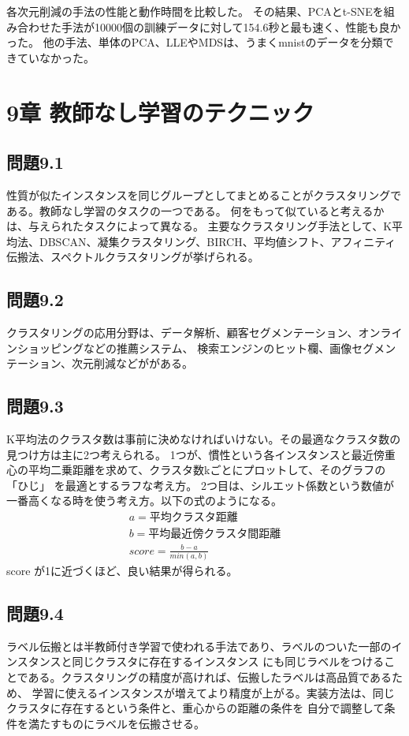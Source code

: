\documentclass[a4j,twocolumn]{jsarticle}
\begin{document}
各次元削減の手法の性能と動作時間を比較した。
その結果、PCAとt-SNEを組み合わせた手法が10000個の訓練データに対して154.6秒と最も速く、性能も良かった。
他の手法、単体のPCA、LLEやMDSは、うまくmnistのデータを分類できていなかった。


\section{9章 教師なし学習のテクニック}
\subsection{問題9.1}
性質が似たインスタンスを同じグループとしてまとめることがクラスタリングである。教師なし学習のタスクの一つである。
何をもって似ていると考えるかは、与えられたタスクによって異なる。
主要なクラスタリング手法として、K平均法、DBSCAN、凝集クラスタリング、BIRCH、平均値シフト、アフィニティ伝搬法、スペクトルクラスタリングが挙げられる。

\subsection{問題9.2}
クラスタリングの応用分野は、データ解析、顧客セグメンテーション、オンラインショッピングなどの推薦システム、
検索エンジンのヒット欄、画像セグメンテーション、次元削減などががある。

\subsection{問題9.3}
K平均法のクラスタ数は事前に決めなければいけない。その最適なクラスタ数の見つけ方は主に2つ考えられる。
1つが、慣性という各インスタンスと最近傍重心の平均二乗距離を求めて、クラスタ数kごとにプロットして、そのグラフの「ひじ」
を最適とするラフな考え方。
2つ目は、シルエット係数という数値が一番高くなる時を使う考え方。以下の式のようになる。
\begin{gather}
a  = 平均クラスタ距離 \\
b = 平均最近傍クラスタ間距離 \\
score = \frac{b-a}{min(a, b)}
\end{gather}
score が1に近づくほど、良い結果が得られる。

\subsection{問題9.4}
ラベル伝搬とは半教師付き学習で使われる手法であり、ラベルのついた一部のインスタンスと同じクラスタに存在するインスタンス
にも同じラベルをつけることである。クラスタリングの精度が高ければ、伝搬したラベルは高品質であるため、
学習に使えるインスタンスが増えてより精度が上がる。実装方法は、同じクラスタに存在するという条件と、重心からの距離の条件を
自分で調整して条件を満たすものにラベルを伝搬させる。
\end{document}
